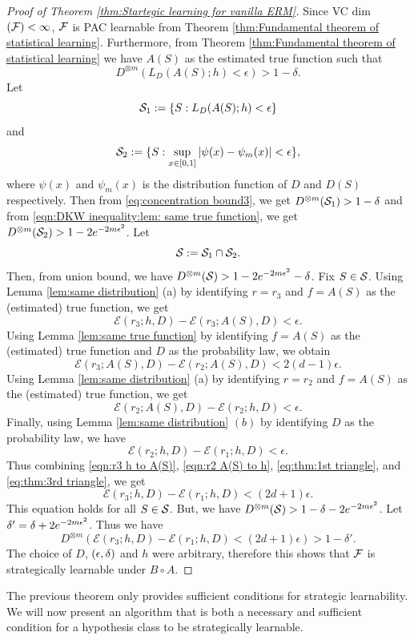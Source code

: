 \begin{proof}[Proof of Theorem \ref{thm:Startegic learning for vanilla ERM}]
Since VC dim$(\mathcal{F}) < \infty$,  $\mathcal{F}$ is PAC learnable from Theorem \ref{thm:Fundamental theorem of statistical learning}. Furthermore, from Theorem  \ref{thm:Fundamental theorem of statistical learning} we have $A(S)$ as the estimated true function such that 
\begin{equation}\label{eq:concentration bound3}
    D^{\otimes m}(L_{D}(A(S);h) < \epsilon) > 1 - \delta.
\end{equation}
Let $$\mathcal{S}_1 := \{S: L_D(A(S);h) < \epsilon\}$$ 
and 
$$\mathcal{S}_2 := \{S: \sup_{x \in [0,1]}|\psi(x) - \psi_m(x)| < \epsilon \},$$
where $\psi(x)$ and $\psi_m(x)$ is the distribution function of $D$ and $D(S)$ respectively.
Then from \eqref{eq:concentration bound3}, we get $D^{\otimes m}(\mathcal{S}_1) > 1-\delta$ and from \eqref{eqn:DKW inequality:lem: same true function}, we get $D^{\otimes m}(\mathcal{S}_2) > 1-2e^{-2m\epsilon^2}$. Let 
\[\mathcal{S} := \mathcal{S}_1 \cap \mathcal{S}_2.\]
Then, from union bound, we have $D^{\otimes m}(\mathcal{S}) >  1-2e^{-2m\epsilon^2} - \delta$.
Fix $S \in \mathcal{S}$.
Using Lemma  \ref{lem:same distribution} (a) by identifying $r = r_3$ and $f = A(S)$ as the (estimated) true function, we get 
\begin{equation}\label{eqn:r3 h to A(S)}
    \mathcal{E}(r_3; h, D) - \mathcal{E}(r_3; A(S), D) < \epsilon.
\end{equation}
Using Lemma \ref{lem:same true function} by identifying $f = A(S)$ as the (estimated) true function and $D$ as the probability law, we obtain
\begin{equation}\label{eq:thm:1st triangle}
    \mathcal{E}(r_3; A(S), D) - \mathcal{E}(r_2; A(S), D) < 2(d-1)\epsilon.
\end{equation}
Using Lemma  \ref{lem:same distribution} (a) by identifying $r = r_2$ and $f = A(S)$ as the (estimated) true function, we get
\begin{equation}\label{eqn:r2 A(S) to h}
    \mathcal{E}(r_2; A(S), D) - \mathcal{E}(r_2; h, D) < \epsilon.
\end{equation}
Finally, using Lemma \ref{lem:same distribution} $(b)$ by identifying $D$ as the probability law, we have
\begin{equation}\label{eq:thm:3rd triangle}
    \mathcal{E}(r_2; h, D) - \mathcal{E}(r_1; h, D) < \epsilon.
\end{equation}
Thus combining \eqref{eqn:r3 h to A(S)}, \eqref{eqn:r2 A(S) to h}, \eqref{eq:thm:1st triangle}, and \eqref{eq:thm:3rd triangle}, we get
\[
\mathcal{E}(r_3; h, D) - \mathcal{E}(r_1; h, D) < (2d + 1)\epsilon.
\]
This equation holds for all $S \in \mathcal{S}$.   But, we have $D^{\otimes m}(\mathcal{S}) > 1-\delta - 2e^{-2m\epsilon^2}$. Let $\delta' = \delta + 2e^{-2m\epsilon^2}$. Thus we have 
\[
D^{\otimes m}(\mathcal{E}(r_3; h, D) - \mathcal{E}(r_1; h, D) < (2d + 1)\epsilon) >  1- \delta'.
\]
The choice of $D$, $(\epsilon,\delta)$ and $h$ were arbitrary, therefore this shows that $\mathcal{F}$ is strategically learnable under $B \circ A$.
\end{proof}

The previous theorem only provides sufficient conditions for strategic learnability. We will now present an algorithm that is both a necessary and sufficient condition for a hypothesis class to be strategically learnable.









